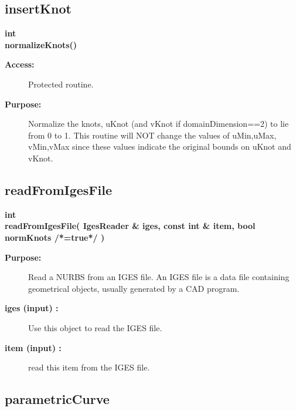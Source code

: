 \subsection{insertKnot}
 
\begin{flushleft} \textbf{%
int  \\ 
\settowidth{\NurbsMappingIncludeArgIndent}{normalizeKnots(}%
normalizeKnots() 
}\end{flushleft}
\begin{description}
\item[{\bf Access:}]  Protected routine.
\item[{\bf Purpose:}]  
    Normalize the knots, uKnot (and vKnot if domainDimension==2) to
 lie from 0 to 1. This routine will NOT change the values of uMin,uMax, vMin,vMax since
 these values indicate the original bounds on uKnot and vKnot.
\end{description}
\subsection{readFromIgesFile}
 
\begin{flushleft} \textbf{%
int  \\ 
\settowidth{\NurbsMappingIncludeArgIndent}{readFromIgesFile(}%
readFromIgesFile( IgesReader \& iges, const int \& item, bool normKnots /*=true*/  )
}\end{flushleft}
\begin{description}
\item[{\bf Purpose:}]  Read a NURBS from an IGES file. An IGES file is a data file
 containing geometrical objects, usually generated by a CAD program.
\item[{\bf iges (input) :}]  Use this object to read the IGES file.
\item[{\bf item (input) :}]  read this item from the IGES file.
\end{description}
\subsection{parametricCurve}
 
